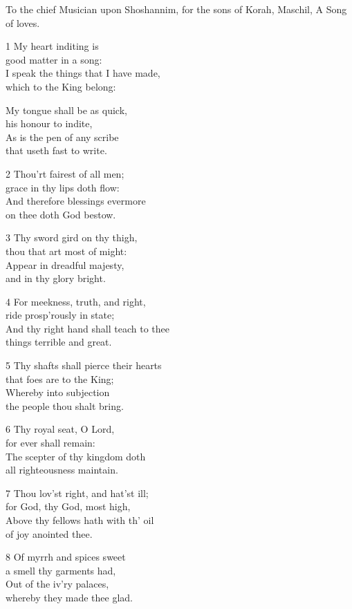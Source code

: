 \begin{multicols}{3}
To the chief Musician upon Shoshannim,
for the sons of Korah, Maschil, A Song of loves.

1 My heart inditing is\\
good matter in a song:\\
I speak the things that I have made,\\
which to the King belong:

My tongue shall be as quick,\\
his honour to indite,\\
As is the pen of any scribe\\
that useth fast to write.

2 Thou’rt fairest of all men;\\
grace in thy lips doth flow:\\
And therefore blessings evermore\\
on thee doth God bestow.

3 Thy sword gird on thy thigh,\\
thou that art most of might:\\
Appear in dreadful majesty,\\
and in thy glory bright.

4 For meekness, truth, and right,\\
ride prosp’rously in state;\\
And thy right hand shall teach to thee\\
things terrible and great.

5 Thy shafts shall pierce their hearts\\
that foes are to the King;\\
Whereby into subjection\\
the people thou shalt bring.

6 Thy royal seat, O Lord,\\
for ever shall remain:\\
The scepter of thy kingdom doth\\
all righteousness maintain.

7 Thou lov’st right, and hat’st ill;\\
for God, thy God, most high,\\
Above thy fellows hath with th’ oil\\
of joy anointed thee.

8 Of myrrh and spices sweet\\
a smell thy garments had,\\
Out of the iv’ry palaces,\\
whereby they made thee glad.


\end{multicols}
